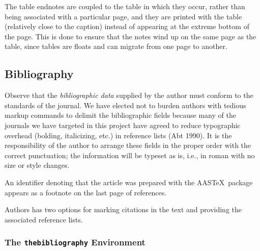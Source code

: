 The table endnotes are coupled to the table in which they occur, rather
than being associated with a particular page, and they are printed with
the table (relatively close to the caption) instead of appearing at the
extreme bottom of the page.  This is done to ensure that the notes wind
up on the same page as the table, since tables are floats and can migrate
from one page to another.

\subsection{Bibliography}

Observe that the {\it bibliographic data\/} supplied by the author must
conform to the standards of the journal.  We have elected not to burden
authors with tedious markup commands
to delimit the bibliographic fields because many of the journals we have
targeted in this project have agreed to reduce typographic overhead (bolding,
italicizing, etc.) in reference lists (Abt 1990).
It is the responsibility of the author to arrange these fields in the proper
order with the correct punctuation; the information will be typeset as is,
i.e., in roman with no size or style changes.

An identifier denoting that the article  was
prepared with the AAS\TeX\ package appears as a footnote
on the last page of references.

Authors has two options for marking citations in the text and providing
the associated reference lists. 

\subsubsection{The {\tt thebibliography} Environment}   \label{bib}


